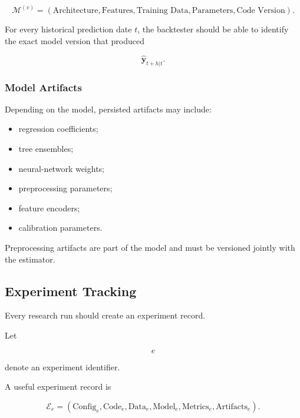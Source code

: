 \documentclass[11pt,a4paper]{article}
\begin{document}
\begin{equation}
\boxed{
\mathcal{M}^{(v)}
=
\left(
\text{Architecture},
\text{Features},
\text{Training Data},
\text{Parameters},
\text{Code Version}
\right).
}
\end{equation}

For every historical prediction date $t$, the backtester should be able to
identify the exact model version that produced

\begin{equation}
\widehat{\mathbf{y}}_{t+h|t}.
\end{equation}


\subsubsection{Model Artifacts}

Depending on the model, persisted artifacts may include:

\begin{itemize}
    \item regression coefficients;
    \item tree ensembles;
    \item neural-network weights;
    \item preprocessing parameters;
    \item feature encoders;
    \item calibration parameters.
\end{itemize}

Preprocessing artifacts are part of the model and must be versioned jointly with
the estimator.


\subsection{Experiment Tracking}
\label{subsec:experiment_tracking}

Every research run should create an experiment record.

Let

\begin{equation}
e
\end{equation}

denote an experiment identifier.

A useful experiment record is

\begin{equation}
\boxed{
\mathcal{E}_e
=
\left(
\mathrm{Config}_e,
\mathrm{Code}_e,
\mathrm{Data}_e,
\mathrm{Model}_e,
\mathrm{Metrics}_e,
\mathrm{Artifacts}_e
\right).
}
\end{equation}
\end{document}
